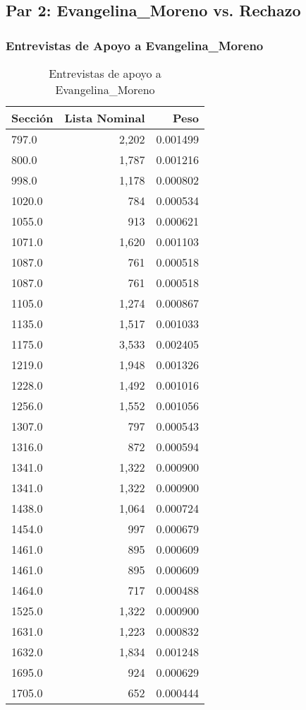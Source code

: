 \documentclass[a4paper,12pt]{article}
\begin{document}
\subsection*{Par 2: Evangelina_Moreno vs. Rechazo}

\subsubsection*{Entrevistas de Apoyo a Evangelina_Moreno}
\begin{table}[h]
\centering
\begin{tabular}{lrr}
\toprule
Sección & Lista Nominal & Peso \\ \midrule
797.0 & 2,202 & 0.001499 \\ 
800.0 & 1,787 & 0.001216 \\ 
998.0 & 1,178 & 0.000802 \\ 
1020.0 & 784 & 0.000534 \\ 
1055.0 & 913 & 0.000621 \\ 
1071.0 & 1,620 & 0.001103 \\ 
1087.0 & 761 & 0.000518 \\ 
1087.0 & 761 & 0.000518 \\ 
1105.0 & 1,274 & 0.000867 \\ 
1135.0 & 1,517 & 0.001033 \\ 
1175.0 & 3,533 & 0.002405 \\ 
1219.0 & 1,948 & 0.001326 \\ 
1228.0 & 1,492 & 0.001016 \\ 
1256.0 & 1,552 & 0.001056 \\ 
1307.0 & 797 & 0.000543 \\ 
1316.0 & 872 & 0.000594 \\ 
1341.0 & 1,322 & 0.000900 \\ 
1341.0 & 1,322 & 0.000900 \\ 
1438.0 & 1,064 & 0.000724 \\ 
1454.0 & 997 & 0.000679 \\ 
1461.0 & 895 & 0.000609 \\ 
1461.0 & 895 & 0.000609 \\ 
1464.0 & 717 & 0.000488 \\ 
1525.0 & 1,322 & 0.000900 \\ 
1631.0 & 1,223 & 0.000832 \\ 
1632.0 & 1,834 & 0.001248 \\ 
1695.0 & 924 & 0.000629 \\ 
1705.0 & 652 & 0.000444 \\ 
\bottomrule
\end{tabular}
\caption{Entrevistas de apoyo a Evangelina_Moreno}
\end{table}
\end{document}
